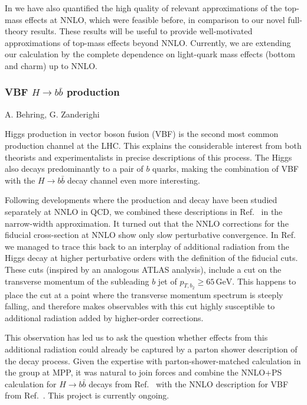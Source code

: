 \documentclass{FBR_Bericht_2025}
\begin{document}
\begin{refsection}
In  we have also quantified the high quality of relevant approximations 
of the top-mass effects at NNLO, which were feasible before, in comparison to our 
novel full-theory results. These results will be useful to provide well-motivated 
approximations of top-mass effects beyond NNLO. Currently, we are extending 
our \minnlo{} calculation by the complete dependence on light-quark mass 
effects (bottom and charm) up to NNLO.

%
\subsubsection{VBF $H\rightarrow b\bar{b}$ production}
\begin{Namen}
A. Behring, G. Zanderighi
\end{Namen}
Higgs production in vector boson fusion (VBF) is the second most common
production channel at the LHC. This explains the considerable interest from
both theorists and experimentalists in precise descriptions of this process.
The Higgs also decays predominantly to a pair of $b$ quarks, making the
combination of VBF with the $H \to b\bar{b}$ decay channel even more
interesting.

Following developments where the production \cite{Asteriadis:2021gpd} and decay
\cite{Behring:2019oci} have been studied separately at NNLO in QCD, we combined
these descriptions in Ref.~\cite{Asteriadis:2024nbg} in the narrow-width
approximation.
%
It turned out that the NNLO corrections for the fiducial cross-section at NNLO
show only slow perturbative convergence. 
In Ref.~\cite{Asteriadis:2024nbg} we managed to trace this back to an interplay
of additional radiation from the Higgs decay at higher perturbative orders with
the definition of the fiducial cuts. These cuts (inspired by an analogous ATLAS
analysis), include a cut on the transverse momentum of the subleading $b$ jet
of $p_{T,b_2} \geq 65\,\mathrm{GeV}$. This happens to place the cut at a point
where the transverse momentum spectrum is steeply falling, and therefore makes
observables with this cut highly susceptible to additional radiation added by
higher-order corrections.

This observation has led us to ask the question whether effects from this additional radiation could already be captured by a parton shower description
of the decay process. %
%
Given the expertise with parton-shower-matched calculation in the group at MPP, it was natural to join forces and combine the NNLO+PS calculation for $H \to b\bar{b}$ decays from Ref.~\cite{Bizon:2019tfo} with the NNLO description for VBF from Ref.~\cite{Asteriadis:2021gpd}. This project is currently ongoing.


\end{refsection}
\end{document}
